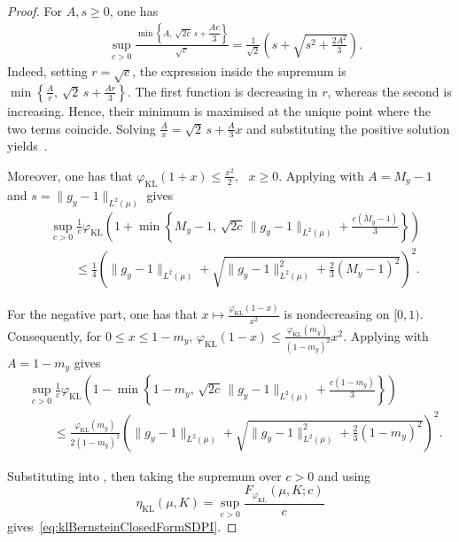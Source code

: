 \documentclass[11pt]{article}
\theoremstyle{plain}
\theoremstyle{remark}
\begin{document}
\begin{proof}
For $A,s\geq0$, one has
\begin{align}
&\sup_{c>0}
\frac{
    \min\left\{
        A,\,
        \sqrt{2c}\,s+\dfrac{Ac}{3}
    \right\}
}{
    \sqrt c
}
=
\frac{1}{\sqrt{2}}
\left(
    s+\sqrt{s^2+\frac{2A^2}{3}}
\right).
\label{eq:bernsteinClippedGaugeLinearization}
\end{align}
Indeed, setting $r=\sqrt c$, the expression inside the supremum is$
    \min\left\{
        \frac{A}{r},\,
        \sqrt{2}\,s+\frac{Ar}{3}
    \right\}.$
The first function is decreasing in $r$, whereas the second is increasing.  Hence, their minimum is maximised at the unique point
where the two terms coincide. Solving
$
\frac{A}{x}
=
\sqrt{2}\,s+\frac{A}{3}x$
and substituting the positive solution yields~.

Moreover, one has that $
    \varphi_{\mathrm{KL}}(1+x)
    \leq
    \frac{x^2}{2}, \text{ }x\geq0.
    \label{eq:klPositiveQuadraticEnvelope}$
Applying
with $A=M_y-1$ and
$s=\lVert g_y-1\rVert_{L^2(\mu)}$ gives
\begin{align}
&\sup_{c>0}
\frac{1}{c}
\varphi_{\mathrm{KL}}
\left(
1+
\min\left\{
M_y-1,\,
\sqrt{2c}\,
\lVert g_y-1\rVert_{L^2(\mu)}
+
\frac{c(M_y-1)}{3}
\right\}
\right)
\nonumber\\
&\qquad\leq
\frac{1}{4}
\left(
    \lVert g_y-1\rVert_{L^2(\mu)}
    +
    \sqrt{
        \lVert g_y-1\rVert_{L^2(\mu)}^2
        +
        \frac{2}{3}(M_y-1)^2
    }
\right)^2.
\label{eq:klPositiveBernsteinLinearization}
\end{align}

For the negative part, one has that
$
    x
    \longmapsto
    \frac{
        \varphi_{\mathrm{KL}}(1-x)
    }{x^2}$
is nondecreasing on $[0,1)$. Consequently, for
$0\leq x\leq1-m_y$, $
    \varphi_{\mathrm{KL}}(1-x)
    \leq
    \frac{
        \varphi_{\mathrm{KL}}(m_y)
    }{
        (1-m_y)^2
    }
    x^2.
    \label{eq:klNegativeQuadraticEnvelope}$
Applying
with $A=1-m_y$ gives
\begin{align}
&\sup_{c>0}
\frac{1}{c}
\varphi_{\mathrm{KL}}
\left(
1-
\min\left\{
1-m_y,\,
\sqrt{2c}\,
\lVert g_y-1\rVert_{L^2(\mu)}
+
\frac{c(1-m_y)}{3}
\right\}
\right)
\nonumber\\
&\qquad\leq
\frac{
    \varphi_{\mathrm{KL}}(m_y)
}{
    2(1-m_y)^2
}
\left(
    \lVert g_y-1\rVert_{L^2(\mu)}
    +
    \sqrt{
        \lVert g_y-1\rVert_{L^2(\mu)}^2
        +
        \frac{2}{3}(1-m_y)^2
    }
\right)^2.
\label{eq:klNegativeBernsteinLinearization}
\end{align}

Substituting
into
, then taking the supremum over $c>0$
and using
\begin{equation}
    \eta_{\mathrm{KL}}(\mu,K)
    =
    \sup_{c>0}
    \frac{
        F_{\varphi_{\mathrm{KL}}}(\mu,K;c)
    }{c}
\end{equation}
gives~\eqref{eq:klBernsteinClosedFormSDPI}.
\end{proof}
\end{document}
